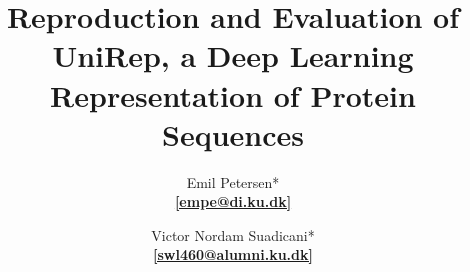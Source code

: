 \title{
    \vspace{6cm}
    \Huge{\textbf{Reproduction and Evaluation of UniRep, a Deep Learning Representation of Protein Sequences}} \\
}

\author{\Large{Emil Petersen}* \\ \href{mailto:empe@di.ku.dk}{\textbf{[empe@di.ku.dk]}} \and \Large{Victor Nordam Suadicani}* \\ \href{mailto:nordam@di.ku.dk}{\textbf{[swl460@alumni.ku.dk]}}
}




\maketitle

\thispagestyle{empty}

\newpage
\setcounter{page}{1}
